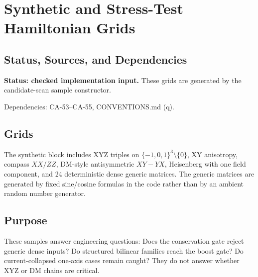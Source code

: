 
\section{Synthetic and Stress-Test Hamiltonian Grids}
\label{sec:qubit-synthetic-grid-families}

\subsection{Status, Sources, and Dependencies}

\textbf{Status: checked implementation input.}  These grids are generated by
the candidate-scan sample constructor.

Dependencies: CA-53--CA-55, CONVENTIONS.md (q).


\subsection{Grids}

The synthetic block includes XYZ triples on \(\{-1,0,1\}^3\setminus\{0\}\),
XY anisotropy, compass \(XX/ZZ\), DM-style antisymmetric \(XY-YX\), Heisenberg
with one field component, and 24 deterministic dense generic matrices.  The
generic matrices are generated by fixed sine/cosine formulas in the code rather
than by an ambient random number generator.

\subsection{Purpose}

These samples answer engineering questions: Does the conservation gate reject
generic dense inputs?  Do structured bilinear families reach the boost gate?
Do current-collapsed one-axis cases remain caught?  They do not answer whether
XYZ or DM chains are critical.
